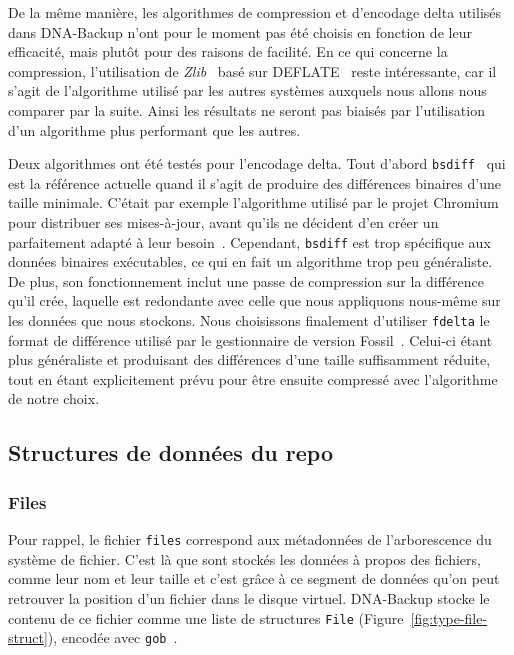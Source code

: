 \documentclass[a4paper]{report}
\begin{document}
De la même manière, les algorithmes de compression et d'encodage delta utilisés dans DNA-Backup
n'ont pour le moment pas été choisis en fonction de leur efficacité,
mais plutôt pour des raisons de facilité.
En ce qui concerne la compression, l'utilisation de \emph{Zlib}~\cite{rfc1950} basé sur DEFLATE~\cite{rfc1951} reste intéressante,
car il s'agit de l'algorithme utilisé par les autres systèmes
auxquels nous allons nous comparer par la suite.
Ainsi les résultats ne seront pas biaisés par l'utilisation d'un algorithme plus performant que les autres.

Deux algorithmes ont été testés pour l'encodage delta.
Tout d'abord \verb|bsdiff|~\cite{percival2003naive} qui est la référence actuelle
quand il s'agit de produire des différences binaires d'une taille minimale.
C'était par exemple l'algorithme utilisé par le projet Chromium pour distribuer ses mises-à-jour,
avant qu'ils ne décident d'en créer un parfaitement adapté à leur besoin~\cite{chromium2012courgette}.
Cependant, \verb|bsdiff| est trop spécifique aux données binaires exécutables,
ce qui en fait un algorithme trop peu généraliste.
De plus, son fonctionnement inclut une passe de compression sur la différence qu'il crée,
laquelle est redondante avec celle que nous appliquons nous-même sur les données que nous stockons.
Nous choisissons finalement d'utiliser \verb|fdelta| le format de différence utilisé par le gestionnaire de version Fossil~\cite{hipp2006fdelta}.
Celui-ci étant plus généraliste et produisant des différences d'une taille suffisamment réduite,
tout en étant explicitement prévu pour être ensuite compressé avec l'algorithme de notre choix.

\subsection{Structures de données du repo}

\subsubsection{Files}
Pour rappel, le fichier \verb|files| correspond aux métadonnées
de l'arborescence du système de fichier.
C'est là que sont stockés les données à propos des fichiers, comme leur nom et leur taille
et c'est grâce à ce segment de données qu'on peut retrouver la position d'un fichier
dans le disque virtuel.
DNA-Backup stocke le contenu de ce fichier comme une liste de structures \verb|File|
(Figure~\ref{fig:type-file-struct}), encodée avec \verb|gob|~\cite{pike2011gob}.
\end{document}
